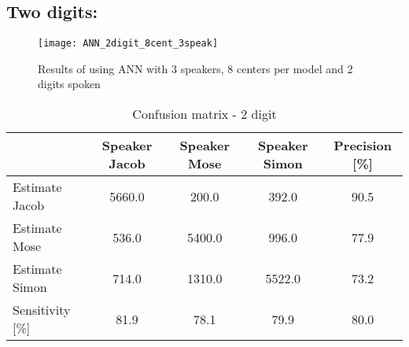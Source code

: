 \subsection{Two digits:}
\begin{figure}[H]
\centering
\texttt{[image: ANN\_2digit\_8cent\_3speak]}
\caption{Results of using ANN with 3 speakers, 8 centers per model and 2 digits spoken}
\label{fig:ANN_fig_1}
\end{figure}


\begin{table}[H]                                                    
\centering                                                          
\begin{tabular}{|l|c|c|c|c|}                                        
\hline                                                              
  & Speaker Jacob & Speaker Mose & Speaker Simon & Precision [\%] \\
\hline                                                              
Estimate Jacob & 5660.0 & 200.0 & 392.0 & 90.5 \\                   
\hline                                                              
Estimate Mose & 536.0 & 5400.0 & 996.0 & 77.9 \\                    
\hline                                                              
Estimate Simon & 714.0 & 1310.0 & 5522.0 & 73.2 \\                  
\hline                                                              
Sensitivity [\%] & 81.9 & 78.1 & 79.9 & 80.0 \\                     
\hline                                                              
\end{tabular}                                                       
\caption{Confusion matrix - 2 digit}                                
\label{table:ANN_conf_2}                                            
\end{table}